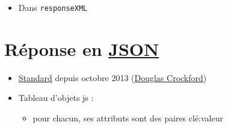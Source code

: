 \begin{english}

\begin{Shaded}
\begin{Highlighting}[]
\end{Highlighting}
\end{Shaded}

\end{english}

\begin{itemize}
\tightlist
\item
  Dans \textenglish{\texttt{responseXML}}
\end{itemize}

\hypertarget{ruxe9ponse-en-json19}{%
\section{\texorpdfstring{Réponse en
\href{http://www.json.org/}{JSON}}{Réponse en JSON}}\label{ruxe9ponse-en-json19}}

\begin{itemize}
\tightlist
\item
  \href{http://www.ecma-international.org/publications/files/ECMA-ST/ECMA-404.pdf}{Standard}
  depuis octobre 2013 (\href{http://www.crockford.com/}{Douglas
  Crockford})
\item
  Tableau d'objets js :

  \begin{itemize}
  \tightlist
  \item
    pour chacun, ses attributs sont des paires clé:valeur
  \end{itemize}
\end{itemize}

